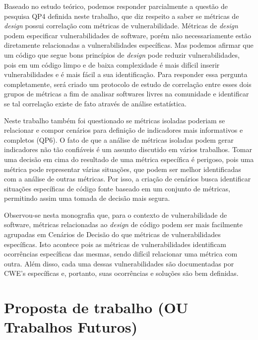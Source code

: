%

Baseado no estudo teórico, podemos responder parcialmente a questão de pesquisa QP4 definida neste trabalho, que diz respeito a saber se métricas de \emph{design} possui correlação com métricas de vulnerabilidade. Métricas de \emph{design} podem especificar vulnerabilidades de software, porém não necessariamente estão diretamente relacionadas a vulnerabilidades específicas. Mas podemos afirmar que um código que segue bons princípios de \emph
{design} pode reduzir vulnerabilidades, pois em um código limpo e de baixa complexidade é mais difícil inserir vulnerabilidades e é mais fácil a sua identificação. Para responder essa pergunta completamente, será criado um protocolo de estudo de correlação entre esses dois grupos de métricas a fim de analisar softwares livres na comunidade e identificar se tal correlação existe de fato através de análise estatística.

%

Neste trabalho também foi questionado se métricas isoladas poderiam se relacionar e compor cenários para definição de indicadores mais informativos e completos (QP6). O fato de que a análise de métricas isoladas podem gerar indicadores não tão confiáveis é um assunto discutido em vários trabalhos. Tomar uma decisão em cima do resultado de uma métrica específica é perigoso, pois uma métrica pode representar várias situações, que podem ser melhor identificadas com a análise de outras métricas. Por isso, a criação de cenários busca identificar situações específicas de código fonte baseado em um conjunto de métricas, permitindo assim uma tomada de decisão mais segura. 

%

Observou-se nesta monografia que, para o contexto de vulnerabilidade de software, métricas relacionadas ao \emph{design} de código podem ser mais facilmente agrupadas em Cenários de Decisão do que métricas de vulnerabilidades específicas. Isto acontece pois as métricas de vulnerabilidades identificam ocorrências específicas das mesmas, sendo difícil relacionar uma métrica com outra. Além disso, cada uma dessas vulnerabilidades são documentadas por CWE's específicas e, portanto, suas ocorrências e soluções são bem definidas.


\section{Proposta de trabalho (OU Trabalhos Futuros)}

